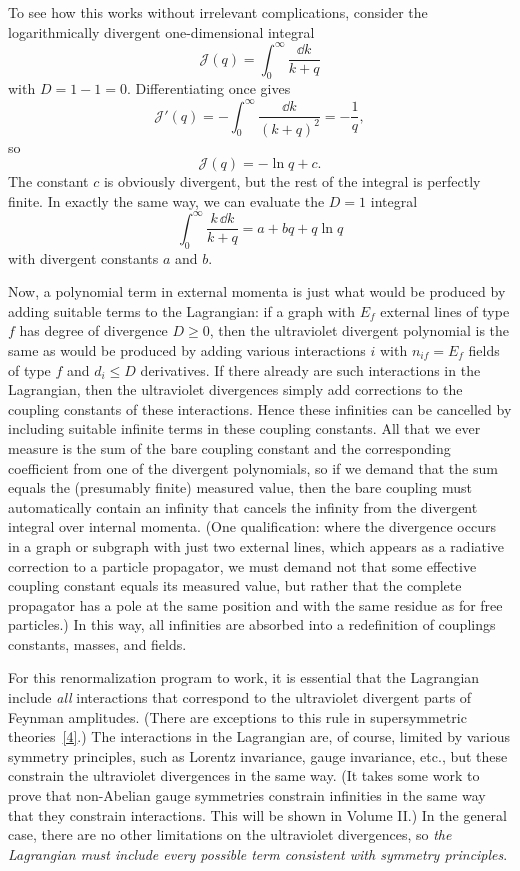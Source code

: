 To see how this works without irrelevant complications, consider the
logarithmically divergent one-dimensional integral
\[
  \mathcal{J}(q)=\int_0^\infty\frac{\dd k}{k+q}
\]
with $D=1-1=0$. Differentiating once gives
\[
  \mathcal{J}'(q)=-\int_0^\infty\frac{\dd k}{(k+q)^2}=-\frac1q,
\]
so
\[
  \mathcal{J}(q)=-\ln q+c.
\]
The constant $c$ is obviously divergent, but the rest of the integral is
perfectly finite. In exactly the same way, we can evaluate the $D=1$
integral
\[
  \int_0^\infty\frac{k\,\dd k}{k+q}=a+bq+q\ln q
\]
with divergent constants $a$ and $b$.

Now, a polynomial term in external momenta is just what would be produced
by adding suitable terms to the Lagrangian: if a graph with $E_f$ external
lines of type $f$ has degree of divergence $D\geq0$, then the ultraviolet
divergent polynomial is the same as would be produced by adding various
interactions $i$ with $n_{if}=E_f$ fields of type $f$ and $d_i\leq D$
derivatives. If there already are such interactions in the Lagrangian, then
the ultraviolet divergences simply add corrections to the coupling constants
of these interactions. Hence these infinities can be cancelled by including
suitable infinite terms in these coupling constants. All that we ever
measure is the sum of the bare coupling constant and the corresponding
coefficient from one of the divergent polynomials, so if we demand that the
sum equals the (presumably finite) measured value, then the bare coupling
must automatically contain an infinity that cancels the infinity from the
divergent integral over internal momenta. (One qualification: where the
divergence occurs in a graph or subgraph with just two external lines, which
appears as a radiative correction to a particle propagator, we must demand
not that some effective coupling constant equals its measured value, but
rather that the complete propagator has a pole at the same position and with
the same residue as for free particles.) In this way, all infinities are
absorbed into a redefinition of couplings constants, masses, and fields.

For this renormalization program to work, it is essential that the Lagrangian
include \emph{all} interactions that correspond to the ultraviolet divergent
parts of Feynman amplitudes. (There are exceptions to this rule in
supersymmetric theories~\hyperref[ref:12.4]{[4]}.) The interactions in the
Lagrangian are, of course, limited by various symmetry principles, such as
Lorentz invariance, gauge invariance, etc., but these constrain the
ultraviolet divergences in the same way. (It takes some work to prove that
non-Abelian gauge symmetries constrain infinities in the same way that they
constrain interactions. This will be shown in Volume II.) In the general
case, there are no other limitations on the ultraviolet divergences, so
\emph{the Lagrangian must include every possible term consistent with
symmetry principles}.

